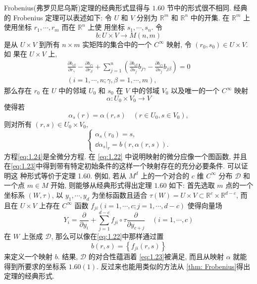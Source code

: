 \begin{remark}
 Frobenius(弗罗贝尼乌斯)定理的经典形式显得与 $1.60$ 节中的形式很不相同. 经典的 Frobenius 定理可以表述如下:
令 $U$ 和 $V$ 分别为 $\mathbb{R}^m$ 和 $\mathbb{R}^n$ 中的开集. 在 $\mathbb{R}^m$ 上使用坐标 $r_1, \cdots, r_m$ 而在 $\mathbb{R}^n$ 上使 用坐标 $s_1, \cdots, s_n$. 令
\begin{equation}
    \label{eq:1.22}
    b: U \times V \rightarrow M(n, m)
\end{equation}
是从 $U \times V$ 到所有 $n \times m$ 实矩阵的集合中的一个 $C^{\infty}$ 映射, 令 $\left(r_0, s_0\right) \in U \times V$. 如 果在 $U \times V$ 上,
\begin{equation}
    \label{eq:1.23}
    \begin{gathered}
\frac{\partial b_{i \beta}}{\partial r_\gamma}-\frac{\partial b_{i \gamma}}{\partial r_\beta}+\sum_{j=1}^n\left(\frac{\partial b_{i \beta}}{\partial s_j} b_{j \gamma}-\frac{\partial b_{i \gamma}}{\partial s_j} b_{j \beta}\right)=0 \\
(i=1, \cdots, n ; \gamma, \beta=1, \cdots, m),
\end{gathered}
\end{equation}
那么存在 $r_0$ 在 $U$ 中的邻域 $U_0$ 和 $s_0$ 在 $V$ 中的邻域 $V_0$ 以及唯一的一个 $C^{\infty}$ 映射
\begin{equation}
    \label{eq:1.24}
    \alpha: U_0 \times V_0 \rightarrow V
\end{equation}
使得若
\begin{equation*}
    \alpha_s (r) =\alpha (r,s)\quad (r\in U_0,s\in V_0),
\end{equation*}
则对所有 $(r,s)\in U_0\times V_0$,
\begin{equation}\label{eq:1.25}
    \begin{cases}
        \alpha_s (r_0)=s,\\ 
        \dd \alpha_s|_r=b(r,\alpha(r,s)).
    \end{cases}
\end{equation}
方程\eqref{eq:1.24}是全微分方程. 在 \eqref{eq:1.22} 中说明映射的微分应像一个图函数, 并且在\eqref{eq:1.23}中得到带有特定初始条件的这样一个映射存在的充分必要条件. 可以证明这 种形式等价于定理 1.60. 例如, 若从 $M^d$ 上的一个对合的 $c$ 维 $C^{\infty}$ 分布 $\mathscr{D}$ 和一个点 $m \in M$ 开始, 则能够从经典形式得出定理 $1.60$ 如下: 首先选取 $m$ 点的一个坐标系 $(W, \tau)$, 以 $y_1, \cdots, y_d$ 为坐标函数且适合 $\tau(W)=U \times V \subset \mathbb{R}^c \times \mathbb{R}^{d-c}$, 而且在 $U \times V$ 上存在 $C^{\infty}$ 函数 $f_{j i}(i=1, \cdots, c ; j=1, \cdots, d-c)$ 使得向量场
\begin{equation}
    \label{eq:1.26}
    Y_i=\frac{\partial}{\partial y_i}+\sum_{j=1}^{d-c} f_{j i} \circ \tau \frac{\partial}{\partial y_{c+j}} \quad(i=1, \cdots, c)
\end{equation}
在 $W$ 上张成 $\mathscr{D}$, 那么可以像在\eqref{eq:1.22}中那样通过置
\begin{equation}
    \label{eq:1.27}
    b(r, s)=\left\{f_{j i}(r, s)\right\}
\end{equation}
来定义一个映射 $b$. 结果, $\mathscr{D}$ 的对合性蕴涵着 \eqref{eq:1.23}被满足, 而且从映射 $\alpha$ 就能得到所要求的坐标系 $1.60(1)$. 反过来也能用类似的方法从 \ref{thm: Frobenius}得出定理的经典形式.



\end{remark}
